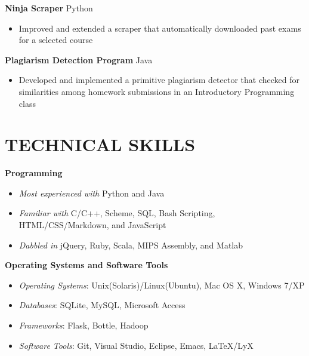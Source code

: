 \documentclass[margin]{res}
\begin{document}
\begin{resume}
\textbf{Ninja Scraper} \hfill Python
\begin{itemize}[leftmargin=10pt]
\itemsep -2pt %
\item Improved and extended a scraper that automatically downloaded past exams for a selected course
\end{itemize}

\textbf{Plagiarism Detection Program} \hfill Java
\begin{itemize}[leftmargin=10pt]
\itemsep -2pt %
\item Developed and implemented a primitive plagiarism detector that checked for similarities among homework submissions in an Introductory Programming class
\end{itemize}

\section{TECHNICAL SKILLS}
\textbf{Programming}
\begin{itemize}[leftmargin=10pt]
\item \textit{Most experienced with} Python and Java
\item \textit{Familiar with} C/C++, Scheme, SQL, Bash Scripting, HTML/CSS/Markdown, and JavaScript
\item \textit{Dabbled in} jQuery, Ruby, Scala, MIPS Assembly, and Matlab
\end{itemize}

\textbf{Operating Systems and Software Tools}
\begin{itemize}[leftmargin=10pt]
\item \textit{Operating Systems}: Unix(Solaris)/Linux(Ubuntu), Mac OS X, Windows 7/XP
\item \textit{Databases}: SQLite, MySQL, Microsoft Access
\item \textit{Frameworks}: Flask, Bottle, Hadoop
\item \textit{Software Tools}: Git, Visual Studio, Eclipse, Emacs, \LaTeX{}/LyX
\end{itemize}

\end{resume}
\end{document}
